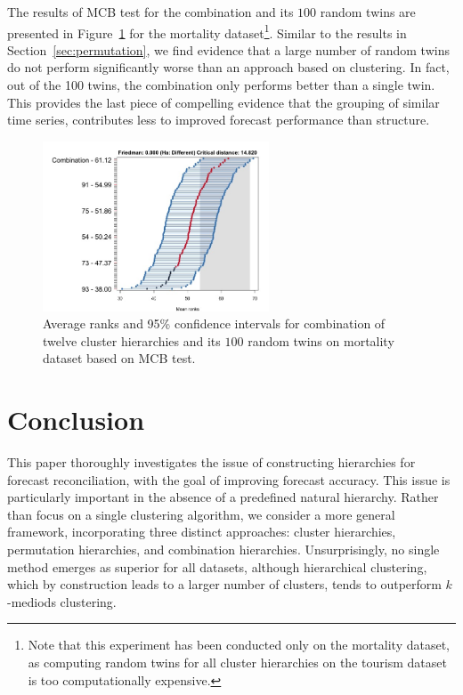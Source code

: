 \documentclass[a4paper,review,12pt,authoryear]{elsarticle}
\begin{document}
The results of MCB test for the combination and its $100$ random twins are presented in Figure~\ref{fig:P4_a_vs_pa} for the mortality dataset\footnote{Note that this experiment has been conducted only on the mortality dataset, as computing random twins for all cluster hierarchies on the tourism dataset is too computationally expensive.}.
Similar to the results in Section~\ref{sec:permutation}, we find evidence that a large number of random twins do not perform significantly worse than an approach based on clustering. In fact, out of the 100 twins, the combination only performs better than a single twin. This provides the last piece of compelling evidence that the grouping of similar time series, contributes less to improved forecast performance than structure.

\begin{figure}[!h]
    \centering
    \includegraphics[width=0.6\textwidth]{../figures/Figure13_mortality_comb_vs_pc.jpg}
    \vspace{-0.1in}\caption{\label{fig:P4_a_vs_pa} Average ranks and 95\% confidence intervals for combination of twelve cluster hierarchies and its $100$ random twins on mortality dataset based on MCB test.}
\end{figure}

\section{Conclusion}
\label{sec:conclusion}

This paper thoroughly investigates the issue of constructing hierarchies for forecast reconciliation, with the goal of improving forecast accuracy. This issue is particularly important in the absence of a predefined natural hierarchy. Rather than focus on a single clustering algorithm, we consider a more general framework, incorporating three distinct approaches: cluster hierarchies, permutation hierarchies, and combination hierarchies. Unsurprisingly, no single method emerges as superior for all datasets, although hierarchical clustering, which by construction leads to a larger number of clusters, tends to outperform $k$-mediods clustering.
\end{document}
